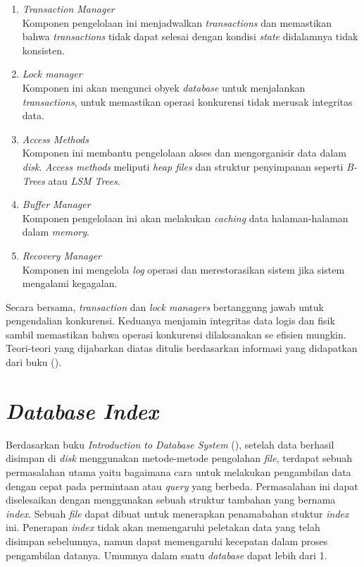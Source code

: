 \begin{enumerate}
	\item \emph{Transaction Manager} \\
	Komponen pengelolaan ini menjadwalkan \emph{transactions} dan 
  memastikan bahwa \emph{transactions} tidak dapat selesai dengan 
  kondisi \emph{state} didalamnya tidak konsisten.

		
	\item \emph{Lock manager} \\
	Komponen ini akan mengunci obyek \emph{database} untuk menjalankan 
  \emph{transactions}, untuk memastikan operasi konkurensi tidak 
  merusak integritas data.


	\item \emph{Access Methods} \\
	Komponen ini membantu pengelolaan akses dan mengorganisir 
  data dalam \emph{disk}. \emph{Access methods} meliputi \emph{heap files} dan 
  struktur penyimpanan seperti \emph{B-Trees} atau \emph{LSM Trees}.


  \item \emph{Buffer Manager} \\
  Komponen pengelolaan ini akan melakukan \emph{caching} data 
  halaman-halaman dalam \emph{memory}. 
  
  \item \emph{Recovery Manager} \\
  Komponen ini mengelola \emph{log} operasi dan merestorasikan 
  sistem jika sistem mengalami kegagalan.
  
\end{enumerate}
  
Secara bersama, \emph{transaction} dan \emph{lock managers} bertanggung 
jawab untuk pengendalian konkurensi. Keduanya menjamin 
integritas data logis dan fisik sambil memastikan bahwa 
operasi konkurensi dilaksanakan se efisien mungkin. Teori-teori yang dijabarkan diatas
ditulis berdasarkan informasi yang didapatkan dari buku (\cite{databaseinternal}).


\section{\emph{Database Index}}
Berdasarkan buku \emph{Introduction to Database System} (\cite{introductiondatabase}), setelah data berhasil disimpan
di \emph{disk} menggunakan metode-metode pengolahan \emph{file}, terdapat sebuah permasalahan utama yaitu bagaimana cara untuk
melakukan pengambilan data dengan cepat pada permintaan atau \emph{query} yang berbeda. Permasalahan ini dapat diselesaikan
dengan menggunakan sebuah struktur tambahan yang bernama \emph{index}. Sebuah \emph{file} dapat dibuat untuk menerapkan penamabahan stuktur 
\emph{index} ini. Penerapan \emph{index} tidak akan memengaruhi peletakan data yang telah disimpan sebelumnya, namun dapat memengaruhi kecepatan
dalam proses pengambilan datanya. Umumnya dalam suatu \emph{database}  dapat lebih dari 1.


